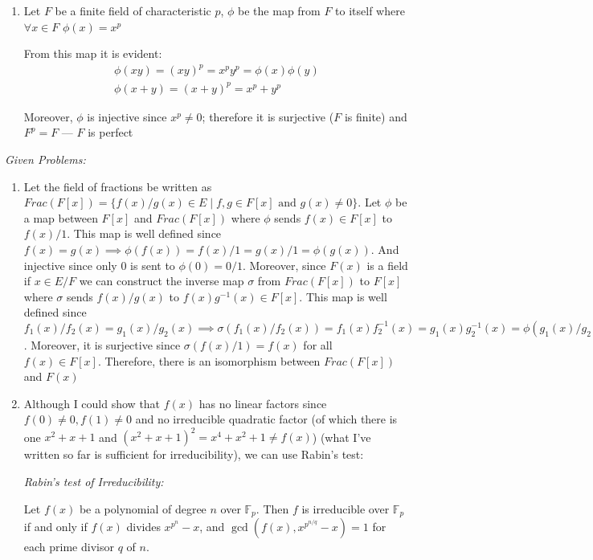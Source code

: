 \documentclass{article}
\begin{document}
\begin{enumerate}
    \item[77.] Let \(F\) be a finite field of characteristic \(p\), \(\phi\) be the map from \(F\) to itself where \(\forall x \in F\) \(\phi (x) = x^p\)
    
    From this map it is evident:
    \begin{eqnarray*}
        \phi (x y) = (x y)^p = x^p y^p = \phi (x) \phi (y) \\
        \phi (x + y) = (x + y)^p = x^p + y^p
    \end{eqnarray*}
    
    Moreover, \(\phi\) is injective since \(x^p \neq 0\); therefore it is surjective (\(F\) is finite) and \(F^p = F\) — \(F\) is perfect
\end{enumerate}

\emph{Given Problems:}
\begin{enumerate}
    \item[1.] Let the field of fractions be written as \(Frac(F[x])=\{f(x) / g(x) \in E \mid f, g \in F[x] \text { and } g(x) \neq 0\}\). Let \(\phi\) be a map between \(F[x]\) and \(Frac(F[x])\) where \(\phi\) sends \(f(x) \in F[x]\) to \(f(x)/1\). This map is well defined since \(f(x) = g(x) \implies \phi(f(x)) = f(x)/1 = g(x)/1 = \phi(g(x))\). And injective since only \(0\) is sent to \(\phi(0) = 0/1\). Moreover, since \(F(x)\) is a field if \(x \in E/F\) we can construct the inverse map \(\sigma\) from \(Frac(F[x])\) to \(F[x]\) where \(\sigma\) sends \(f(x)/g(x)\) to \(f(x)g^{-1}(x) \in F[x]\). This map is well defined since \(f_1(x)/f_2(x) = g_1(x)/g_2(x) \implies \sigma (f_1(x)/f_2(x)) = f_1(x)f_2^{-1}(x) = g_1(x)g_2^{-1}(x) = \phi(g_1(x)/g_2(x)) \iff f_1(x)g_2(x) = g_1(x)f_2(x)\). Moreover, it is surjective since \(\sigma(f(x)/1) = f(x)\) for all \(f(x) \in F[x]\). Therefore, there is an isomorphism between \(Frac(F[x])\) and \(F(x)\)

    \item[2.] Although I could show that \(f(x)\) has no linear factors since \(f(0) \neq 0, f(1) \neq 0\) and no irreducible quadratic factor (of which there is one \(x^2 + x + 1\) and \((x^2 + x + 1)^2 = x^4 + x^2 + 1 \neq f(x)\)) (what I've written so far is sufficient for irreducibility), we can use Rabin's test:
    
    \emph{Rabin's test of Irreducibility:}

    Let $f(x)$ be a polynomial of degree $n$ over $\mathbb{F}_p$. Then $f$ is irreducible over $\mathbb{F}_p$ if and only if $f(x)$ divides $x^{p^n}-x$, and $\operatorname{gcd}\left(f(x), x^{p^{n / q}}-x\right)=1$ for each prime divisor $q$ of $n$.


\end{enumerate}
\end{document}
